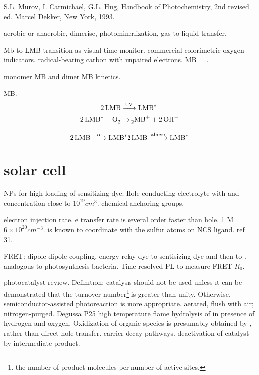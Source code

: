 

S.L. Murov, I. Carmichael, G.L. Hug, Handbook of Photochemistry, 2nd revised ed. Marcel Dekker, New York, 1993.

aerobic or anaerobic, dimerise, photominerlization, gas to liquid transfer.

Mb to LMB transition as visual time monitor. commercial colorimetric oxygen indicators. radical-bearing carbon with unpaired electrons. MB = .\cite{Galagan2008}

monomer MB and dimer MB kinetics.\cite{Spencer1979}



MB. \cite{Lee2003a}
\begin{align}
\cee{ 2LMB &->[\text{UV}] LMB^*\\
2LMB^* + O2 &\rightarrow 2MB^+ + 2OH^-}
\end{align}

\[
\cee{2LMB ->[\alpha] LMB^*}
\cee{2LMB ->[\text{above}] LMB^*}
\]


\section{solar cell}


 NPs for high loading of sensitizing dye. Hole conducting electrolyte with  and  concentration close to $10^19 cm^3$. chemical anchoring groups.

electron injection rate. e transfer rate is several order faster than hole. 1 M = $6\times10^{20} cm^{-3}$.  is known to coordinate with the sulfur atoms on NCS ligand. ref 31.

FRET: dipole-dipole coupling, energy relay dye to sentisizing dye and then to . analogous to photosynthesis bacteria. Time-resolved PL to measure FRET $R_0$.

photocatalyst review.\cite{Mills1997} Definition: catalysis should not be used unless it can be demonstrated that the turnover number\footnote{the number of product molecules per number of active sites.} is greater than unity. Otherwise, semiconductor-assisted photoreaction is more appropriate. aerated, flush with air; nitrogen-purged. Degussa P25  high temperature flame hydrolysis of  in presence of hydrogen and oxygen. Oxidization of organic species is presumably obtained by , rather than direct hole transfer. carrier decay pathways. deactivation of catalyst by intermediate product.

